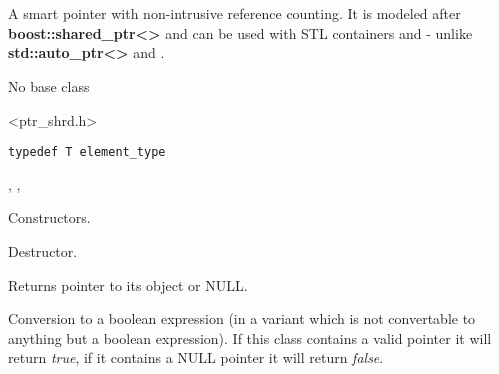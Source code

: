 \section{}\label{wxsharedptr}

A smart pointer with non-intrusive reference counting. It is modeled
after {\bf boost::shared\_ptr<>} and can be used with STL containers 
and  - unlike {\bf std::auto\_ptr<>}
and .


No base class


<ptr\_shrd.h>


{\small%
\begin{verbatim}
typedef T element_type
\end{verbatim}
}%


, ,




\label{wxsharedptrwxsharedptr}



Constructors.

\label{wxsharedptrdtor}


Destructor.

\label{wxsharedptrget}


Returns pointer to its object or NULL.

\label{wxsharedptroperatorbool}


Conversion to a boolean expression (in a variant which is not 
convertable to anything but a boolean expression). If this class
contains a valid pointer it will return {\it true}, if it contains
a NULL pointer it will return {\it false}.

